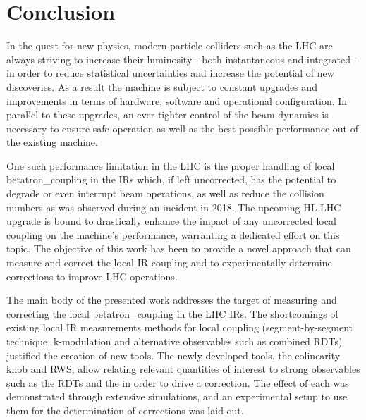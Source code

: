\chapter{Conclusion}
\label{chapter:conclusion}

In the quest for new physics, modern particle colliders such as the \gls{LHC} are always striving to increase their \gls{luminosity} - both instantaneous and integrated - in order to reduce statistical uncertainties and increase the potential of new discoveries.
As a result the machine is subject to constant upgrades and improvements in terms of hardware, software and operational configuration.
In parallel to these upgrades, an ever tighter control of the \gls{beam} dynamics is necessary to ensure safe operation as well as the best possible performance out of the existing machine.

One such performance limitation in the \gls{LHC} is the proper handling of local \gls{betatron_coupling} in the \glspl{IR} which, if left uncorrected, has the potential to degrade or even interrupt beam operations, as well as reduce the collision numbers as was observed during an incident in \num{2018}.
The upcoming \gls{HL-LHC} upgrade is bound to drastically enhance the impact of any uncorrected local coupling on the machine's performance, warranting a dedicated effort on this topic.
The objective of this work has been to provide a novel approach that can measure and correct the local \gls{IR} coupling and to experimentally determine corrections to improve \gls{LHC} operations.
\break

The main body of the presented work addresses the target of measuring and correcting the local \gls{betatron_coupling} in the LHC \glspl{IR}.
The shortcomings of existing local \gls{IR} measurements methods for local coupling (segment-by-segment technique, k-modulation and alternative observables such as combined \glspl{RDT}) justified the creation of new tools.
The newly developed tools, the colinearity \gls{knob} and \gls{RWS}, allow relating relevant quantities of interest to strong observables such as the \glspl{RDT} and the  in order to drive a correction.
The effect of each was demonstrated through extensive simulations, and an experimental setup to use them for the determination of corrections was laid out.

